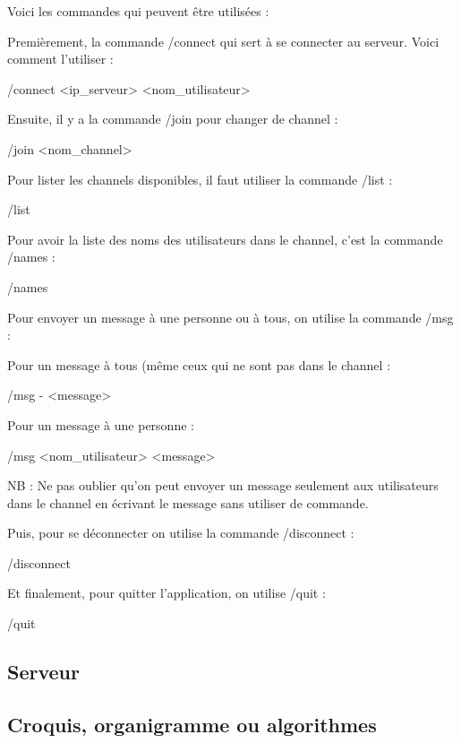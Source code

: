 \documentclass[12pt,french]{article}
\begin{document}
            Voici les commandes qui peuvent être utilisées : 

            Premièrement, la commande /connect qui sert à se connecter au serveur. Voici comment l'utiliser :

            /connect <ip_serveur> <nom_utilisateur>

            Ensuite, il y a la commande /join pour changer de channel :

            /join <nom_channel>

            Pour lister les channels disponibles, il faut utiliser la commande /list :

            /list

            Pour avoir la liste des noms des utilisateurs dans le channel, c'est la commande /names :

            /names

            Pour envoyer un message à une personne ou à tous, on utilise la commande /msg :

            Pour un message à tous (même ceux qui ne sont pas dans le channel :

            /msg - <message>

            Pour un message à une personne :

            /msg <nom_utilisateur> <message>

            NB : Ne pas oublier qu'on peut envoyer un message seulement aux utilisateurs dans le channel en écrivant le message sans utiliser de commande.

            Puis, pour se déconnecter on utilise la commande /disconnect :

            /disconnect

            Et finalement, pour quitter l'application, on utilise /quit :

            /quit


        \subsection{Serveur} %
        \label{sub:serveur}


        \subsection{Croquis, organigramme ou algorithmes} %
        \label{sub:croquis-org-algo}
\end{document}
